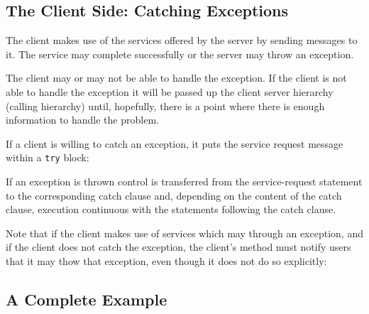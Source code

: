 
\subsection{The Client Side: Catching Exceptions}

The client makes use of the services offered by the server by sending messages
to it. The service may complete successfully or the server may throw an
exception.

The client may or may not be able to handle the exception. If the client is not
able to handle the exception it will be passed up the client server hierarchy
(calling hierarchy) until, hopefully, there is a point where there is enough 
information to handle the problem. 

If a client is willing to catch an exception, it puts the service request message
within a \verb+try+ block:


If an exception is thrown control is transferred from the service-request
statement to the corresponding catch clause and, depending on the content
of the catch clause, execution continuous with the statements following 
the catch clause.

Note that if the client makes use of services which may through an exception,
and if the client does not catch the exception, the client's method must
notify users that it may thow that exception, even though it does not do so 
explicitly:



\subsection{A Complete Example}

